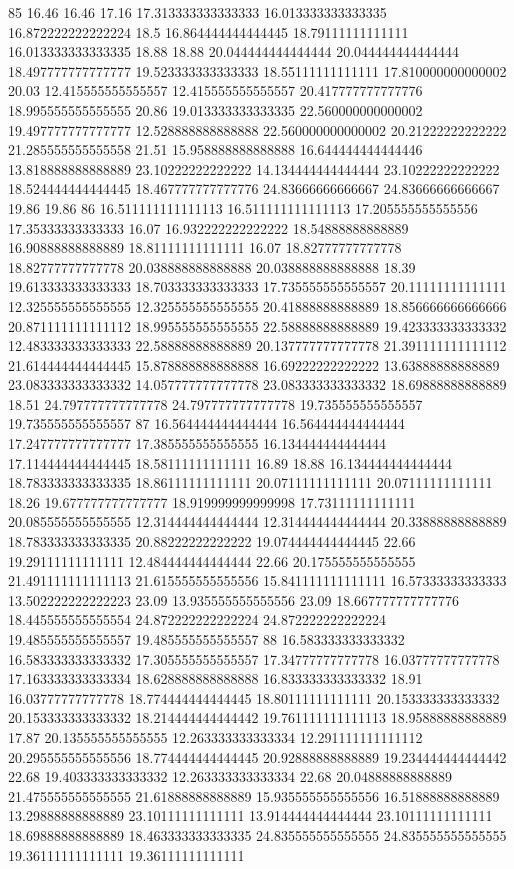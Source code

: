 85 16.46 16.46 17.16 17.313333333333333 16.013333333333335 16.872222222222224 18.5 16.864444444444445 18.79111111111111 16.013333333333335 18.88 18.88 20.044444444444444 20.044444444444444 18.497777777777777 19.523333333333333 18.55111111111111 17.810000000000002 20.03 12.415555555555557 12.415555555555557 20.417777777777776 18.995555555555555 20.86 19.013333333333335 22.560000000000002 19.497777777777777 12.528888888888888 22.560000000000002 20.21222222222222 21.285555555555558 21.51 15.958888888888888 16.644444444444446 13.818888888888889 23.10222222222222 14.134444444444444 23.10222222222222 18.524444444444445 18.467777777777776 24.83666666666667 24.83666666666667 19.86 19.86
86 16.511111111111113 16.511111111111113 17.205555555555556 17.35333333333333 16.07 16.932222222222222 18.54888888888889 16.90888888888889 18.81111111111111 16.07 18.82777777777778 18.82777777777778 20.038888888888888 20.038888888888888 18.39 19.613333333333333 18.703333333333333 17.735555555555557 20.11111111111111 12.325555555555555 12.325555555555555 20.41888888888889 18.856666666666666 20.871111111111112 18.995555555555555 22.58888888888889 19.423333333333332 12.483333333333333 22.58888888888889 20.137777777777778 21.391111111111112 21.614444444444445 15.878888888888888 16.69222222222222 13.63888888888889 23.083333333333332 14.057777777777778 23.083333333333332 18.69888888888889 18.51 24.797777777777778 24.797777777777778 19.735555555555557 19.735555555555557
87 16.564444444444444 16.564444444444444 17.247777777777777 17.385555555555555 16.134444444444444 17.114444444444445 18.58111111111111 16.89 18.88 16.134444444444444 18.783333333333335 18.86111111111111 20.07111111111111 20.07111111111111 18.26 19.677777777777777 18.919999999999998 17.73111111111111 20.085555555555555 12.314444444444444 12.314444444444444 20.33888888888889 18.783333333333335 20.88222222222222 19.074444444444445 22.66 19.29111111111111 12.484444444444444 22.66 20.175555555555555 21.491111111111113 21.615555555555556 15.841111111111111 16.57333333333333 13.502222222222223 23.09 13.935555555555556 23.09 18.667777777777776 18.445555555555554 24.872222222222224 24.872222222222224 19.485555555555557 19.485555555555557
88 16.583333333333332 16.583333333333332 17.305555555555557 17.34777777777778 16.03777777777778 17.163333333333334 18.628888888888888 16.833333333333332 18.91 16.03777777777778 18.774444444444445 18.80111111111111 20.153333333333332 20.153333333333332 18.214444444444442 19.761111111111113 18.95888888888889 17.87 20.135555555555555 12.263333333333334 12.291111111111112 20.295555555555556 18.774444444444445 20.92888888888889 19.234444444444442 22.68 19.403333333333332 12.263333333333334 22.68 20.04888888888889 21.475555555555555 21.61888888888889 15.935555555555556 16.51888888888889 13.29888888888889 23.10111111111111 13.914444444444444 23.10111111111111 18.69888888888889 18.463333333333335 24.835555555555555 24.835555555555555 19.36111111111111 19.36111111111111
